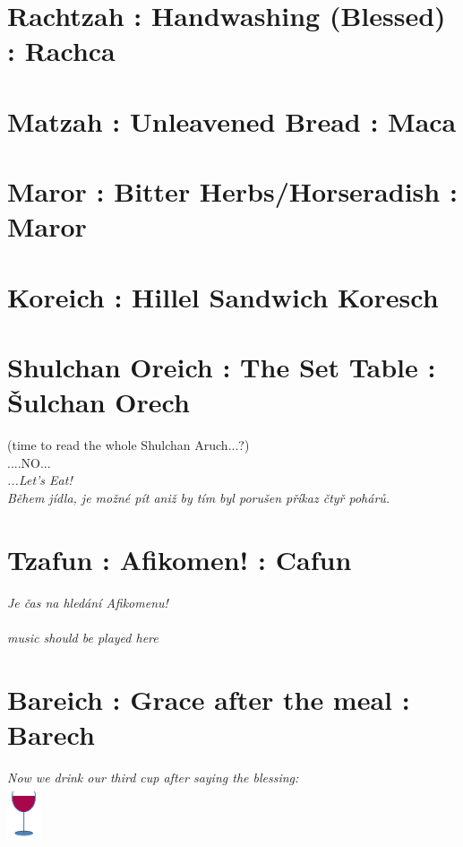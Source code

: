 \documentclass[a5paper,10pt]{memoir}
\begin{document}
\section{Rachtzah : Handwashing (Blessed) : Rachca}
\NetilatYadayim
\raggedright 

\section{Matzah : Unleavened Bread : Maca}
\HaMotzi
\Matzah

\section{Maror : Bitter Herbs/Horseradish : Maror}
\Maror

\section{Koreich : Hillel Sandwich Koresch}
\Koreich

\section{Shulchan Oreich : The Set Table : Šulchan Orech}
\color{midblue} (time to read the whole Shulchan Aruch...?)\\
\centering ....NO... \\ 
\hspace*{5mm} \textit{{\raggedleft ...Let's Eat!} \\ \color{black} Během jídla, je možné  pít aniž by tím byl porušen příkaz čtyř pohárů.}

\section{Tzafun : Afikomen! : Cafun}
\textit{\color{black} Je čas na hledání Afikomenu!\\
\\
music should be played here}

\section{Bareich : Grace after the meal : Barech}
\Bareich
\textit{\color{midblue} Now we drink our third cup after saying the blessing:}\\
\color{black}
\vspace*{1ex}
\hfill\includegraphics[width=10mm]{cup}
\vspace*{-15ex}  %
\end{document}
